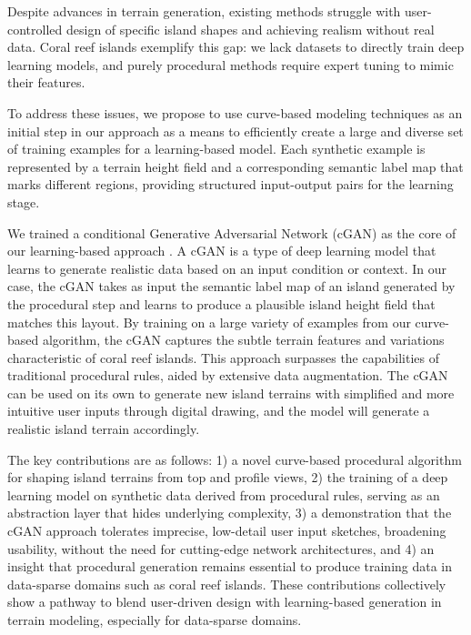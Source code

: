 Despite advances in terrain generation, existing methods struggle with user-controlled design of specific island shapes and achieving realism without real data. Coral reef islands exemplify this gap: we lack datasets to directly train deep learning models, and purely procedural methods require expert tuning to mimic their features.

To address these issues, we propose to use curve-based modeling techniques as an initial step in our approach as a means to efficiently create a large and diverse set of training examples for a learning-based model. Each synthetic example is represented by a terrain height field and a corresponding semantic label map that marks different regions, providing structured input-output pairs for the learning stage.

We trained a conditional Generative Adversarial Network (cGAN) as the core of our learning-based approach \cite{Mirza2014,Isola2017}. A cGAN is a type of deep learning model that learns to generate realistic data based on an input condition or context. In our case, the cGAN takes as input the semantic label map of an island generated by the procedural step and learns to produce a plausible island height field that matches this layout. By training on a large variety of examples from our curve-based algorithm, the cGAN captures the subtle terrain features and variations characteristic of coral reef islands. This approach surpasses the capabilities of traditional procedural rules, aided by extensive data augmentation. The cGAN can be used on its own to generate new island terrains with simplified and more intuitive user inputs through digital drawing, and the model will generate a realistic island terrain accordingly.

The key contributions are as follows: 1) a novel curve-based procedural algorithm for shaping island terrains from top and profile views, 2) the training of a deep learning model on synthetic data derived from procedural rules, serving as an abstraction layer that hides underlying complexity, 3) a demonstration that the cGAN approach tolerates imprecise, low-detail user input sketches, broadening usability, without the need for cutting-edge network architectures, and 4) an insight that procedural generation remains essential to produce training data in data-sparse domains such as coral reef islands. 
These contributions collectively show a pathway to blend user-driven design with learning-based generation in terrain modeling, especially for data-sparse domains.